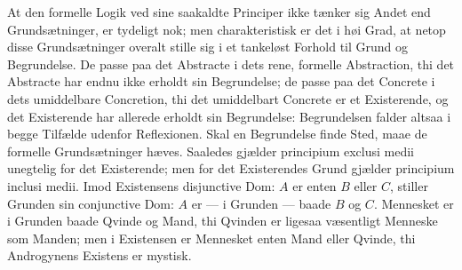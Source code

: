 \documentclass[12pt]{book}
\newcommand{\opage}[1]{\marginnote{\footnotesize\textit{[#1]}}}
\begin{document}
\opage{101} At den formelle Logik ved sine saakaldte Principer ikke tænker sig Andet end
Grundsætninger, er tydeligt nok; men charakteristisk er det i høi Grad, at netop disse
Grundsætninger overalt stille sig i et tankeløst Forhold til Grund og Begrundelse. De
passe paa det Abstracte i dets rene, formelle Abstraction, thi det Abstracte har endnu
ikke erholdt sin Begrundelse; de passe paa det Concrete i dets umiddelbare
Concretion, thi det umiddelbart Concrete er et Existerende, og det Existerende har
allerede erholdt sin Begrundelse: Begrundelsen falder altsaa i begge Tilfælde udenfor
Reflexionen. Skal en Begrundelse finde Sted, maae de formelle Grundsætninger hæves.
Saaledes gjælder principium exclusi medii unegtelig for det Existerende; men for det
Existerendes Grund gjælder principium inclusi medii. Imod Existensens disjunctive Dom:
$A$ er enten $B$ eller $C$, stiller Grunden sin conjunctive Dom: $A$ er --- i Grunden
--- baade $B$ og $C$. Mennesket er i Grunden baade Qvinde og Mand, thi Qvinden er
ligesaa væsentligt Menneske som Manden; men i Existensen er Mennesket enten Mand eller
Qvinde, thi Androgynens Existens er mystisk.
\end{document}
